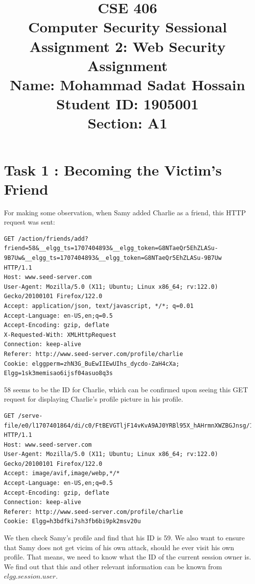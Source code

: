 \documentclass[12pt]{article}
\title{CSE 406 \\
Computer Security Sessional \\
\vspace{10mm}
Assignment 2: Web Security Assignment \\
\vspace{20mm}
Name: Mohammad Sadat Hossain \\
\vspace{5mm}
Student ID: 1905001 \\
\vspace{5mm}
Section: A1 \\
\vspace{15mm}
\RaggedRight
}
\author{}
\date{}
\begin{document}
\maketitle
\newpage

\section*{Task 1 : Becoming the Victim’s Friend}
For making some observation, when Samy added Charlie as a friend, this HTTP request was sent:

\begin{verbatim}
GET /action/friends/add?friend=58&__elgg_ts=1707404893&__elgg_token=G8NTaeQr5EhZLASu-9B7Uw&__elgg_ts=1707404893&__elgg_token=G8NTaeQr5EhZLASu-9B7Uw HTTP/1.1
Host: www.seed-server.com
User-Agent: Mozilla/5.0 (X11; Ubuntu; Linux x86_64; rv:122.0) Gecko/20100101 Firefox/122.0
Accept: application/json, text/javascript, */*; q=0.01
Accept-Language: en-US,en;q=0.5
Accept-Encoding: gzip, deflate
X-Requested-With: XMLHttpRequest
Connection: keep-alive
Referer: http://www.seed-server.com/profile/charlie
Cookie: elggperm=zhN3G_BuEwIIEwUIhs_dycdo-ZaH4cXa; Elgg=1sk3memisao6ijsf04asuo8q3s
\end{verbatim}

58 seems to be the ID for Charlie, which can be confirmed upon seeing this GET request for displaying Charlie's profile picture in his profile.

\begin{verbatim}
GET /serve-file/e0/l1707401864/di/c0/FtBEVGTljF14vKvA9AJ0YRBl95X_hAHrmnXWZBGJnsg/1/58/profile/58large.jpg HTTP/1.1
Host: www.seed-server.com
User-Agent: Mozilla/5.0 (X11; Ubuntu; Linux x86_64; rv:122.0) Gecko/20100101 Firefox/122.0
Accept: image/avif,image/webp,*/*
Accept-Language: en-US,en;q=0.5
Accept-Encoding: gzip, deflate
Connection: keep-alive
Referer: http://www.seed-server.com/profile/charlie
Cookie: Elgg=h3bdfki7sh3fb6bi9pk2msv20u
\end{verbatim}

We then check Samy's profile and find that his ID is 59. We also want to ensure that Samy does not get vicim of his own attack, should he ever visit his own profile. That means, we need to know what the ID of the current session owner is. We find out that this and other relevant information can be known from $elgg.session.user$.
\end{document}
